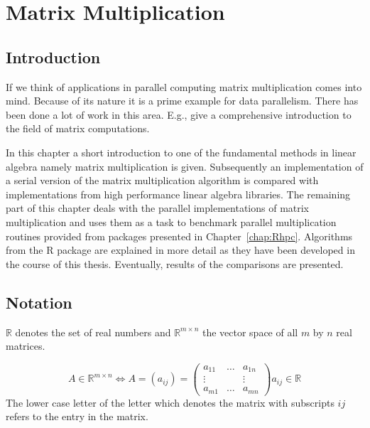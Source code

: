 

\newcommand{\NROW}{\textbf{nrow}}
\newcommand{\NCOL}{\textbf{ncol}}
\newcommand{\OMPFOR}{\textbf{!\$omp parallel for }}
\newcommand{\OMPPRIV}{\textbf{private}}
\newcommand{\OMPSHARE}{\textbf{shared}}
\newcommand{\SERIALMM}{\textbf{serial.mult}}
\newcommand{\MAX}{\textbf{max}}
\chapter{Matrix Multiplication}
\label{chap:matrix}
\section{Introduction}

If we think of applications in parallel computing matrix
multiplication comes into mind. Because of its nature it is a prime
example for data parallelism. There has been done a lot of work in
this area. E.g., \cite{golub96mc} give a comprehensive introduction to the
field of matrix computations. 


In this chapter a short introduction to one of the fundamental methods
in linear algebra namely matrix multiplication is
given. Subsequently an implementation of a serial version of the matrix
multiplication algorithm is compared with implementations from high
performance linear algebra libraries. The remaining part of this
chapter deals with the parallel implementations of matrix
multiplication and uses them as a task to benchmark parallel
multiplication routines provided from packages presented in
Chapter~\ref{chap:Rhpc}. Algorithms from the R package  are
explained in more detail as they have been developed in the course of
this thesis. Eventually, results of the comparisons are presented.

\section{Notation}

$ \mathbb{R} $ denotes the set of real numbers and $ \mathbb{R}^{m
  \times n} $ the vector space of all $m$ by $n$ real matrices.

$$ A \in \mathbb{R}^{m \times n} \Longleftrightarrow A = (a_{ij}) = 
\left( \begin{array}{ccc}
a_{11} & \ldots & a_{1n} \\
\vdots &        & \vdots \\
a_{m1} & \ldots & a_{mn}
\end{array} \right)
a_{ij} \in \mathbb{R}
 $$
The lower case letter of the letter which denotes the matrix with
subscripts $ij$ refers to the entry in the matrix. 

